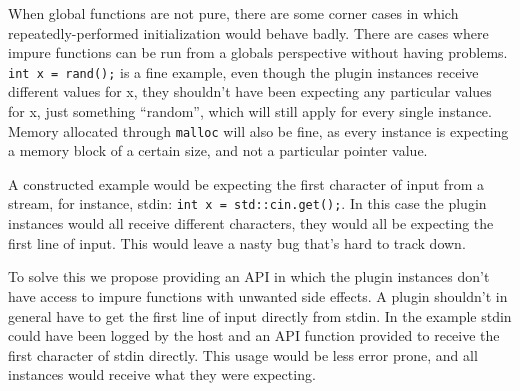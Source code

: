 When global functions are not pure, there are some corner cases in which
repeatedly-performed initialization would behave badly.
There are cases where impure functions can be run from a globals perspective
without having problems.
\texttt{int x = rand();} is a fine example, even though the plugin instances
receive different values for x, they shouldn't have been expecting any
particular values for x, just something ``random'', which will still apply for
every single instance.
Memory allocated through \texttt{malloc} will also be fine, as every instance is
expecting a memory block of a certain size, and not a particular pointer value.

A constructed example would be expecting the first character of input from a
stream, for instance, stdin: \texttt{int x = std::cin.get();}.
In this case the plugin instances would all receive different characters, they
would all be expecting the first line of input.
This would leave a nasty bug that's hard to track down.

To solve this we propose providing an API in which the plugin instances don't
have access to impure functions with unwanted side effects.
A plugin shouldn't in general have to get the first line of input directly from
stdin.
In the example stdin could have been logged by the host and an API function
provided to receive the first character of stdin directly.
This usage would be less error prone, and all instances would receive what they
were expecting.
